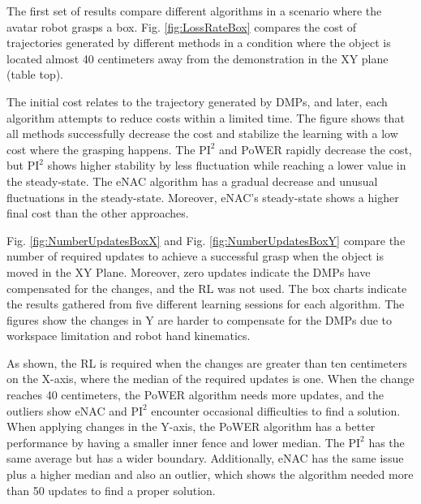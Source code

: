 \documentclass[letterpaper, 10 pt, conference]{ieeeconf}  %
\begin{document}
The first set of results compare different algorithms in a scenario where the avatar robot grasps a box. Fig. \ref{fig:LossRateBox} compares the cost of trajectories generated by different methods in a condition where the object is located almost 40 centimeters away from the demonstration in the XY plane (table top). 

\noindent
The initial cost relates to the trajectory generated by DMPs, and later, each algorithm attempts to reduce costs within a limited time. The figure shows that all methods successfully decrease the cost and stabilize the learning with a low cost where the grasping happens. The $\textrm{PI}^2$ and PoWER rapidly decrease the cost, but $\textrm{PI}^2$ shows higher stability by less fluctuation while reaching a lower value in the steady-state. The eNAC algorithm has a gradual decrease and unusual fluctuations in the steady-state. Moreover, eNAC's steady-state shows a higher final cost than the other approaches.

\noindent
Fig. \ref{fig:NumberUpdatesBoxX} and Fig. \ref{fig:NumberUpdatesBoxY} compare the number of required updates to achieve a successful grasp when the object is moved in the XY Plane. Moreover, zero updates indicate the DMPs have compensated for the changes, and the RL was not used. The box charts indicate the results gathered from five different learning sessions for each algorithm. The figures show the changes in Y are harder to compensate for the DMPs due to workspace limitation and robot hand kinematics.

\noindent
As shown, the RL is required when the changes are greater than ten centimeters on the X-axis, where the median of the required updates is one. When the change reaches 40 centimeters, the PoWER algorithm needs more updates, and the outliers show eNAC and $\textrm{PI}^2$ encounter occasional difficulties to find a solution. When applying changes in the Y-axis, the PoWER algorithm has a better performance by having a smaller inner fence and lower median. The $\textrm{PI}^2$ has the same average but has a wider boundary. Additionally, eNAC has the same issue plus a higher median and also an outlier, which shows the algorithm needed more than 50 updates to find a proper solution. 

\end{document}
